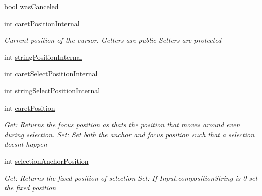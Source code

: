 \begin{DoxyCompactItemize}
bool \mbox{\hyperlink{class_t_m_pro_1_1_t_m_p___input_field_a6f9abe7ff08ce17ffece2dc9a6df3ae9}{was\+Canceled}}
\item 
int \mbox{\hyperlink{class_t_m_pro_1_1_t_m_p___input_field_a48b9911b7de2a895d5411f4526a1acc1}{caret\+Position\+Internal}}
\begin{DoxyCompactList}\small\item\em Current position of the cursor. Getters are public Setters are protected \end{DoxyCompactList}\item 
int \mbox{\hyperlink{class_t_m_pro_1_1_t_m_p___input_field_a6d8ce3c8a0d73fc9eafc686186c6d75a}{string\+Position\+Internal}}
\item 
int \mbox{\hyperlink{class_t_m_pro_1_1_t_m_p___input_field_a370c7d141866bb8a55fe40919dd3c28d}{caret\+Select\+Position\+Internal}}
\item 
int \mbox{\hyperlink{class_t_m_pro_1_1_t_m_p___input_field_a70a7a69109043b8b87e3169cd2347501}{string\+Select\+Position\+Internal}}
\item 
int \mbox{\hyperlink{class_t_m_pro_1_1_t_m_p___input_field_a3d3a39b5c399ed120a847fed2d842d81}{caret\+Position}}
\begin{DoxyCompactList}\small\item\em Get\+: Returns the focus position as thats the position that moves around even during selection. Set\+: Set both the anchor and focus position such that a selection doesn\textquotesingle{}t happen \end{DoxyCompactList}\item 
int \mbox{\hyperlink{class_t_m_pro_1_1_t_m_p___input_field_ad2940845ebee386ae2b382a25761ce8c}{selection\+Anchor\+Position}}
\begin{DoxyCompactList}\small\item\em Get\+: Returns the fixed position of selection Set\+: If Input.\+composition\+String is 0 set the fixed position \end{DoxyCompactList}\item 

\end{DoxyCompactItemize}
